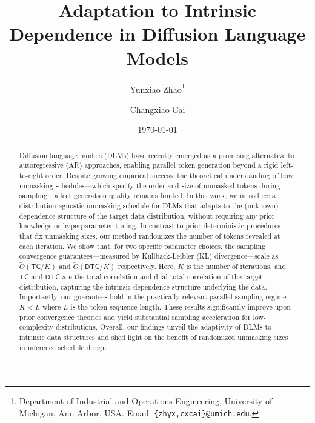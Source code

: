 \documentclass[english]{article}
\title{Adaptation to Intrinsic Dependence in Diffusion Language Models}
\author{
  Yunxiao Zhao\thanks{Department of Industrial and Operations Engineering, University of Michigan, Ann Arbor, USA.
  {Email: \texttt{\{zhyx,cxcai\}@umich.edu}.}
  }
  \and
  Changxiao Cai\footnotemark[1]
}
\date{\today}
\begin{document}
\theoremstyle{plain} 
\newtheorem{lemma}{\bf Lemma} 
\newtheorem{proposition}{\bf Proposition}
\newtheorem{theorem}{\bf Theorem}
\newtheorem{corollary}{\bf Corollary} 
\newtheorem{claim}{\bf Claim}

\theoremstyle{remark}
\newtheorem{assumption}{\bf Assumption} 
\newtheorem{definition}{\bf Definition} 
\newtheorem{condition}{\bf Condition}
\newtheorem{property}{\bf Property} 
\newtheorem{example}{\bf Example}
\newtheorem{fact}{\bf Fact}
\newtheorem{remark}{\bf Remark}


\maketitle 
\setcounter{tocdepth}{2}



\begin{abstract}

Diffusion language models (DLMs) have recently emerged as a promising alternative to autoregressive (AR) approaches, enabling parallel token generation beyond a rigid left-to-right order.
Despite growing empirical success, the theoretical understanding of how unmasking schedules---which specify the order and size of unmasked tokens during sampling---affect generation quality remains limited.
In this work, we introduce a distribution-agnostic unmasking schedule for DLMs that adapts to the (unknown) dependence structure of the target data distribution, without requiring any prior knowledge or hyperparameter tuning.
In contrast to prior deterministic procedures that fix unmasking sizes, our method randomizes the number of tokens revealed at each iteration.
We show that, for two specific parameter choices, the sampling convergence guarantees---measured by Kullback-Leibler (KL) divergence---scale as $\widetilde O(\mathsf{TC}/K)$ and $\widetilde O(\mathsf{DTC}/K)$ respectively. Here, $K$ is the number of iterations, and $\mathsf{TC}$ and $\mathsf{DTC}$ are the total correlation and dual total correlation of the target distribution, capturing the intrinsic dependence structure underlying the data.
Importantly, our guarantees hold in the practically relevant parallel-sampling regime $K<L$ where $L$ is the token sequence length.
These results significantly improve upon prior convergence theories and yield substantial sampling acceleration for low-complexity distributions. 
Overall, our findings unveil the adaptivity of DLMs to intrinsic data structures and shed light on the benefit of randomized unmasking sizes in inference schedule design.
\end{abstract}
\end{document}
